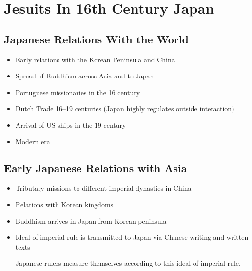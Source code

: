 \documentclass[class=article, crop=false]{standalone}
\begin{document}
  \section{Jesuits In 16th Century Japan}
  \subsection{Japanese Relations With the World}
  \begin{itemize}
    \item Early relations with the Korean Peninsula and China
    \item Spread of Buddhism across Asia and to Japan
    \item Portuguese missionaries in the 16 century
    \item Dutch Trade 16--19 centuries (Japan highly regulates outside interaction)
    \item Arrival of US ships in the 19 century
    \item Modern era
  \end{itemize}
  \subsection{Early Japanese Relations with Asia}
  \begin{itemize}
    \item Tributary missions to different imperial dynasties in China
    \item Relations with Korean kingdoms
    \item Buddhism arrives in Japan from Korean peninsula
    \item Ideal of imperial rule is transmitted to Japan via Chinese writing and written texts
    \begin{note}{}
      Japanese rulers measure themselves according to this ideal of imperial rule.
    \end{note}
  \end{itemize}
\end{document}
